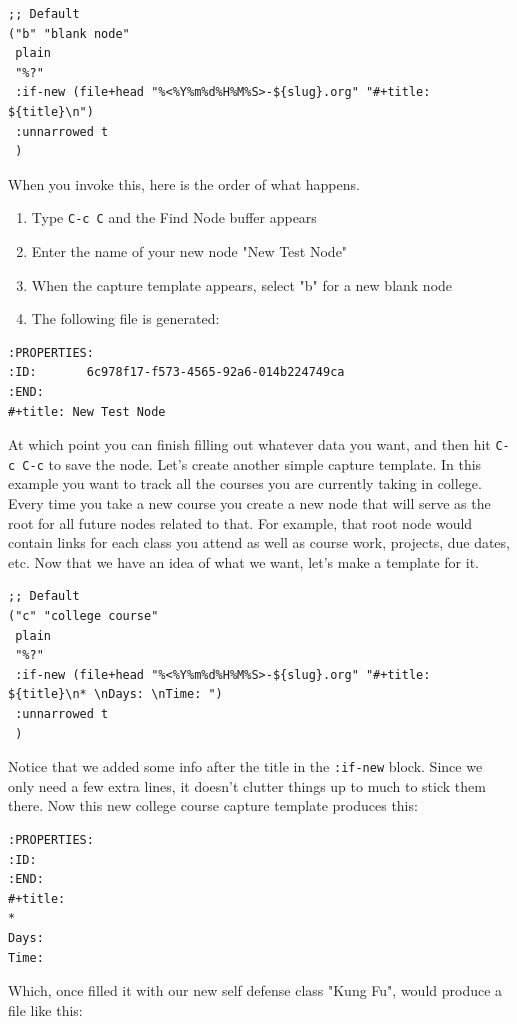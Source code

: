 \documentclass[11pt]{article}
\begin{document}
\begin{verbatim}
;; Default
("b" "blank node"
 plain
 "%?"
 :if-new (file+head "%<%Y%m%d%H%M%S>-${slug}.org" "#+title: ${title}\n")
 :unnarrowed t
 )
\end{verbatim}

When you invoke this, here is the order of what happens.

\begin{enumerate}
\item Type \texttt{C-c C} and the Find Node buffer appears
\item Enter the name of your new node "New Test Node"
\item When the capture template appears, select "b" for a new blank node
\item The following file is generated:
\end{enumerate}

\begin{verbatim}
:PROPERTIES:
:ID:       6c978f17-f573-4565-92a6-014b224749ca
:END:
#+title: New Test Node
\end{verbatim}

At which point you can finish filling out whatever data you want, and then hit \texttt{C-c C-c} to save the node. Let's create another simple capture template. In this example you want to track all the courses you are currently taking in college. Every time you take a new course you create a new node that will serve as the root for all future nodes related to that. For example, that root node would contain links for each class you attend as well as course work, projects, due dates, etc. Now that we have an idea of what we want, let's make a template for it.

\begin{verbatim}
;; Default
("c" "college course"
 plain
 "%?"
 :if-new (file+head "%<%Y%m%d%H%M%S>-${slug}.org" "#+title: ${title}\n* \nDays: \nTime: ")
 :unnarrowed t
 )
\end{verbatim}

Notice that we added some info after the title in the \texttt{:if-new} block. Since we only need a few extra lines, it doesn't clutter things up to much to stick them there. Now this new college course capture template produces this:

\begin{verbatim}
:PROPERTIES:
:ID:
:END:
#+title:
*
Days:
Time:
\end{verbatim}

Which, once filled it with our new self defense class "Kung Fu", would produce a file like this:
\end{document}
